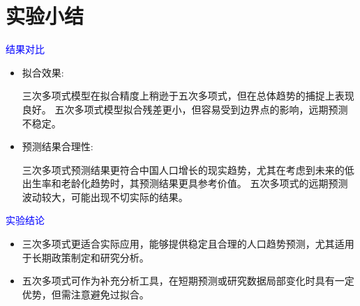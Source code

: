 \documentclass[10pt]{article}
\begin{document}
\section{实验小结}
\textcolor{blue}{结果对比}
\begin{itemize}
  \item 
  拟合效果:
  
  三次多项式模型在拟合精度上稍逊于五次多项式，但在总体趋势的捕捉上表现良好。
  五次多项式模型拟合残差更小，但容易受到边界点的影响，远期预测不稳定。
  \item 预测结果合理性:
  
  三次多项式预测结果更符合中国人口增长的现实趋势，尤其在考虑到未来的低出生率和老龄化趋势时，其预测结果更具参考价值。
  五次多项式的远期预测波动较大，可能出现不切实际的结果。
\end{itemize}

\textcolor{blue}{实验结论}
\begin{itemize}
  \item 
  三次多项式更适合实际应用，能够提供稳定且合理的人口趋势预测，尤其适用于长期政策制定和研究分析。
  \item
  五次多项式可作为补充分析工具，在短期预测或研究数据局部变化时具有一定优势，但需注意避免过拟合。
\end{itemize}
\end{document}
